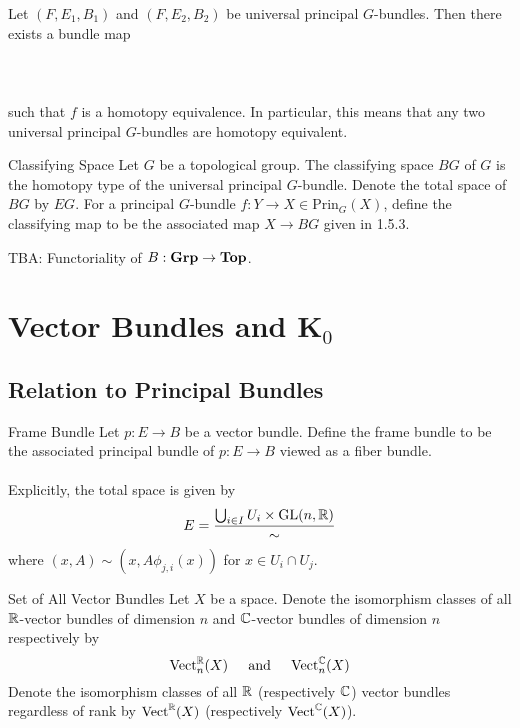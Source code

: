 \documentclass[a4paper]{article}
\begin{document}
\begin{thm}{}{} Let $(F,E_1,B_1)$ and $(F,E_2,B_2)$ be universal principal $G$-bundles. Then there exists a bundle map \\~\\
\\~\\
such that $f$ is a homotopy equivalence. In particular, this means that any two universal principal $G$-bundles are homotopy equivalent. 
\end{thm}

\begin{defn}{Classifying Space}{} Let $G$ be a topological group. The classifying space $BG$ of $G$ is the homotopy type of the universal principal $G$-bundle. Denote the total space of $BG$ by $EG$. For a principal $G$-bundle $f:Y\to X\in\text{Prin}_G(X)$, define the classifying map to be the associated map $X\to BG$ given in 1.5.3. 
\end{defn}

TBA: Functoriality of $B:\bold{Grp}\to\bold{Top}$. 

\pagebreak
\section{Vector Bundles and K${_0}$}
\subsection{Relation to Principal Bundles}
\begin{defn}{Frame Bundle}{} Let $p:E\to B$ be a vector bundle. Define the frame bundle to be the associated principal bundle of $p:E\to B$ viewed as a fiber bundle. \\~\\

Explicitly, the total space is given by $$E=\frac{\bigcup_{i\in I}U_i\times\text{GL}(n,\mathbb{R})}{\sim}$$ where $(x,A)\sim(x,A\phi_{j,i}(x))$ for $x\in U_i\cap U_j$. 
\end{defn}

\begin{defn}{Set of All Vector Bundles}{} Let $X$ be a space. Denote the isomorphism classes of all $\mathbb{R}$-vector bundles of dimension $n$ and $\mathbb{C}$-vector bundles of dimension $n$ respectively by $$\text{Vect}_n^{\mathbb{R}}(X)\;\;\;\;\text{ and }\;\;\;\;\text{Vect}_n^{\mathbb{C}}(X)$$ Denote the isomorphism classes of all $\mathbb{R}$ (respectively $\mathbb{C}$) vector bundles regardless of rank by $\text{Vect}^{\mathbb{R}}(X)$ (respectively $\text{Vect}^{\mathbb{C}}(X)$). 
\end{defn}
\end{document}
